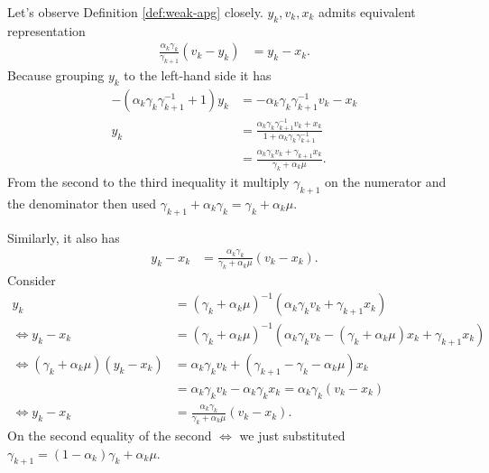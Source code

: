 \documentclass[12pt]{article}
\begin{document}
    \begin{observation}\label{obs:weak-apg-observation-1}
        Let's observe Definition \ref*{def:weak-apg} closely. 
        $y_k, v_k, x_k$ admits equivalent representation 
        \begin{align*}
            \frac{\alpha_k \gamma_k}{\gamma_{k + 1}}(v_k - y_k) &= y_k - x_k. 
        \end{align*}
        Because grouping $y_k$ to the left-hand side it has 
        \begin{align*}
            -(\alpha_k \gamma_k\gamma_{k + 1}^{-1} + 1)y_k
            &= 
            - \alpha_k \gamma_k \gamma_{k + 1}^{-1}v_k - x_k
            \\
            y_k &= 
            \frac{
                \alpha_k \gamma_k \gamma_{k + 1}^{-1}v_k + x_k
            }{1 + \alpha_k \gamma_k \gamma_{k + 1}^{-1}}
            \\
            &=  
            \frac{\alpha_k \gamma_k v_k + \gamma_{k + 1}x_k}{\gamma_k + \alpha_k \mu}. 
        \end{align*}
        From the second to the third inequality it multiply $\gamma_{k + 1}$ on the numerator and the denominator then used $\gamma_{k + 1} + \alpha_k \gamma_k = \gamma_k + \alpha_k \mu$. 
        \par
        Similarly, it also has 
        \begin{align*}
            y_k - x_k &= 
            \frac{\alpha_k \gamma_k}{\gamma_k + \alpha_k \mu}(v_k - x_k). 
        \end{align*}
        Consider
        \begin{align*}
            y_k &= (\gamma_k + \alpha_k \mu)^{-1}(\alpha_k \gamma_k v_k + \gamma_{k + 1} x_k)
            \\
            \iff
            y_k - x_k &= 
            (\gamma_k + \alpha_k \mu)^{-1}
            (\alpha_k \gamma_k v_k - (\gamma_k + \alpha_k \mu)x_k + \gamma_{k + 1}x_k)
            \\
            \iff 
            (\gamma_k + \alpha_k \mu)(y_k - x_k)
            &= 
            \alpha_k\gamma_k v_k + 
            (\gamma_{k + 1} - \gamma_k - \alpha_k \mu) x_k
            \\
            &= \alpha_k \gamma_k v_k - \alpha_k \gamma_k x_k = \alpha_k \gamma_k(v_k - x_k)
            \\
            \iff 
            y_k - x_k &= 
            \frac{\alpha_k \gamma_k}{\gamma_k + \alpha_k \mu}(v_k - x_k). 
        \end{align*}
        On the second equality of the second $\iff$ we just substituted $\gamma_{k + 1} = (1 - \alpha_k)\gamma_k + \alpha_k \mu$. 
    \end{observation}
\end{document}
